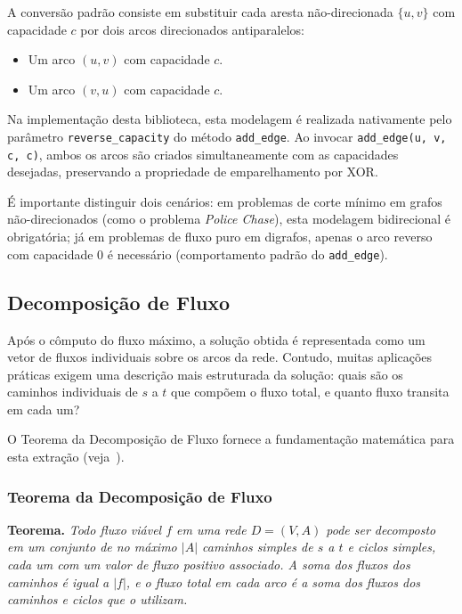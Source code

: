 \documentclass[12pt,a4paper]{article}
\begin{document}
A conversão padrão consiste em substituir cada aresta não-direcionada $\{u,v\}$ com capacidade $c$ por dois arcos direcionados antiparalelos:
\begin{itemize}
    \item Um arco $(u,v)$ com capacidade $c$.
    \item Um arco $(v,u)$ com capacidade $c$.
\end{itemize}

Na implementação desta biblioteca, esta modelagem é realizada nativamente pelo parâmetro \lstinline{reverse_capacity} do método \lstinline{add_edge}. Ao invocar \lstinline{add_edge(u, v, c, c)}, ambos os arcos são criados simultaneamente com as capacidades desejadas, preservando a propriedade de emparelhamento por XOR.

É importante distinguir dois cenários: em problemas de corte mínimo em grafos não-direcionados (como o problema \textit{Police Chase}), esta modelagem bidirecional é obrigatória; já em problemas de fluxo puro em digrafos, apenas o arco reverso com capacidade $0$ é necessário (comportamento padrão do \lstinline{add_edge}).

\subsection{Decomposição de Fluxo}

Após o cômputo do fluxo máximo, a solução obtida é representada como um vetor de fluxos individuais sobre os arcos da rede. Contudo, muitas aplicações práticas exigem uma descrição mais estruturada da solução: quais são os caminhos individuais de $s$ a $t$ que compõem o fluxo total, e quanto fluxo transita em cada um?

O Teorema da Decomposição de Fluxo fornece a fundamentação matemática para esta extração (veja~\cite{ahuja1993network, schrijver2003combinatorial}).

\subsubsection{Teorema da Decomposição de Fluxo}

\textbf{Teorema.} \textit{Todo fluxo viável $f$ em uma rede $D = (V, A)$ pode ser decomposto em um conjunto de no máximo $|A|$ caminhos simples de $s$ a $t$ e ciclos simples, cada um com um valor de fluxo positivo associado. A soma dos fluxos dos caminhos é igual a $|f|$, e o fluxo total em cada arco é a soma dos fluxos dos caminhos e ciclos que o utilizam.}
\end{document}
